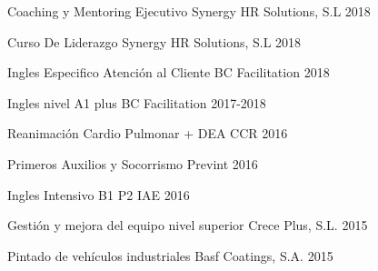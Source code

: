 

\begin{cventries}

  \cventry
    {Coaching y Mentoring Ejecutivo} %
    {Synergy HR Solutions, S.L} %
    {} %
    {2018} %
    {}

  \cventry
    {Curso De Liderazgo} %
    {Synergy HR Solutions, S.L} %
    {} %
    {2018} %
    {}

  \cventry
    {Ingles Especifico Atención al Cliente} %
    {BC Facilitation} %
    {} %
    {2018} %
    {}

  \cventry
    {Ingles nivel A1 plus} %
    {BC Facilitation} %
    {} %
    {2017-2018} %
    {}

  \cventry
    {Reanimación Cardio Pulmonar + DEA} %
    {CCR} %
    {} %
    {2016} %
    {}

  \cventry
    {Primeros Auxilios y Socorrismo} %
    {Prevint} %
    {} %
    {2016} %
    {}

  \cventry
    {Ingles Intensivo B1 P2} %
    {IAE} %
    {} %
    {2016} %
    {}

  \cventry
    {Gestión y mejora del equipo nivel superior} %
    {Crece Plus, S.L.} %
    {} %
    {2015} %
    {}

  \cventry
    {Pintado de vehículos industriales} %
    {Basf Coatings, S.A.} %
    {} %
    {2015} %
    {}


\end{cventries}
